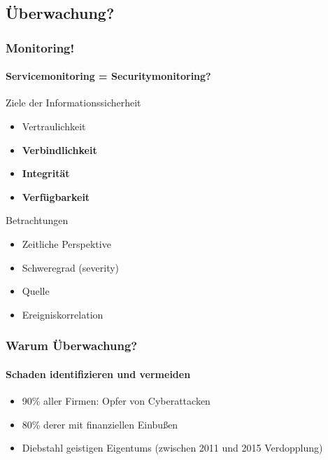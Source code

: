 
\subsection{Überwachung?}
\begin{frame}
    \frametitle{Monitoring!}
    \framesubtitle{Servicemonitoring = Securitymonitoring?}
    
    \pause
    
   \begin{exampleblock}{Ziele der Informationssicherheit}
        \begin{itemize}
            \item   Vertraulichkeit
            \item   \textbf{Verbindlichkeit}
            \item   \textbf{Integrität}       
            \item   \textbf{Verfügbarkeit}
        \end{itemize}     
   \end{exampleblock}
    \pause
    \begin{exampleblock}{Betrachtungen}
        \begin{itemize}
            \item Zeitliche Perspektive
            \item Schweregrad (severity)
            \item Quelle
            \item Ereigniskorrelation
        \end{itemize} 
    \end{exampleblock}
            
\end{frame}

\begin{frame}
\frametitle{Warum Überwachung?}
\framesubtitle{Schaden identifizieren und vermeiden}

    \begin{itemize}
        \item 90\% aller Firmen: Opfer von Cyberattacken
        \item 80\% derer mit finanziellen Einbußen
        \item Diebstahl geistigen Eigentums (zwischen 2011 und 2015 Verdopplung) 
    \end{itemize}

\end{frame}

